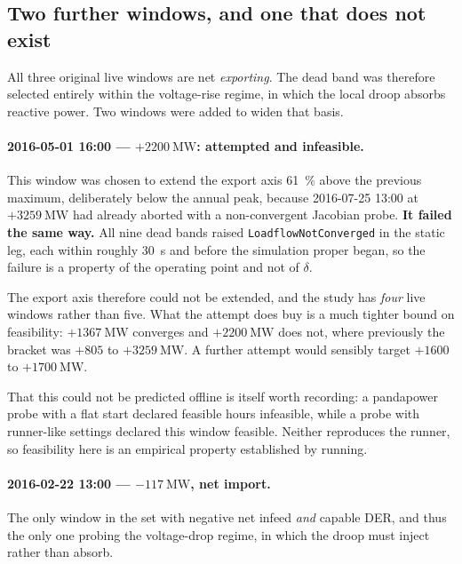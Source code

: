 \documentclass[11pt,a4paper]{article}
\newcommand{\dz}{\ensuremath{\delta}}
\begin{document}
\subsection{Two further windows, and one that does not exist}
\label{sec:extra-windows}

All three original live windows are net \emph{exporting}. The dead band was
therefore selected entirely within the voltage-rise regime, in which the local
droop absorbs reactive power. Two windows were added to widen that basis.

\paragraph{2016-05-01 16:00 --- $+\SI{2200}{\mega\watt}$: attempted and
infeasible.} This window was chosen to extend the export axis
\SI{61}{\percent} above the previous maximum, deliberately below the annual
peak, because 2016-07-25 13:00 at $+\SI{3259}{\mega\watt}$ had already aborted
with a non-convergent Jacobian probe. \textbf{It failed the same way.} All nine
dead bands raised \texttt{LoadflowNotConverged} in the static leg, each within
roughly \SI{30}{\second} and before the simulation proper began, so the failure
is a property of the operating point and not of $\dz$.

The export axis therefore could not be extended, and the study has \emph{four}
live windows rather than five. What the attempt does buy is a much tighter
bound on feasibility: $+\SI{1367}{\mega\watt}$ converges and
$+\SI{2200}{\mega\watt}$ does not, where previously the bracket was
$+805$ to $+\SI{3259}{\mega\watt}$. A further attempt would sensibly target
$+1600$ to $+\SI{1700}{\mega\watt}$.

That this could not be predicted offline is itself worth recording: a
pandapower probe with a flat start declared feasible hours infeasible, while a
probe with runner-like settings declared this window feasible. Neither
reproduces the runner, so feasibility here is an empirical property established
by running.

\paragraph{2016-02-22 13:00 --- $-\SI{117}{\mega\watt}$, net import.} The only
window in the set with negative net infeed \emph{and} capable DER, and thus the
only one probing the voltage-drop regime, in which the droop must inject rather
than absorb.
\end{document}
